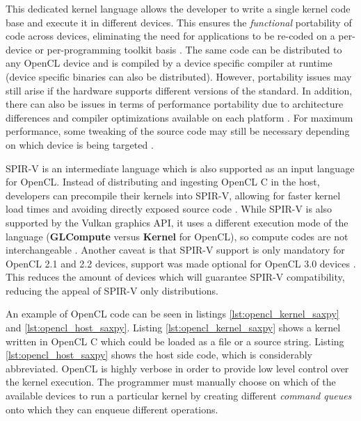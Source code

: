 This dedicated kernel language allows the developer to write a single kernel code base and execute it in different devices. This ensures the \textit{functional} portability of code across devices, eliminating the need for applications to be re-coded on a per-device or per-programming toolkit basis \cite{performance_portability_2013}. The same code can be distributed to any OpenCL device and is compiled by a device specific compiler at runtime (device specific binaries can also be distributed). However, portability issues may still arise if the hardware supports different versions of the standard. In addition, there can also be issues in terms of performance portability due to architecture differences and compiler optimizations available on each platform \cite{performance_portability_2013, performance_portability_2019, performance_portability_2020}. For maximum performance, some tweaking of the source code may still be necessary depending on which device is being targeted \cite{optimizing_opencl_fpga_integer, optimizing_opencl_fpga_automata}.

SPIR-V is an intermediate language which is also supported as an input language for OpenCL. Instead of distributing and ingesting OpenCL C in the host, developers can precompile their kernels into SPIR-V, allowing for faster kernel load times and avoiding directly exposed source code \cite{spir_overview}. While SPIR-V is also supported by the Vulkan \cite{vulkan} graphics API, it uses a different execution mode of the language (\textbf{GLCompute} versus \textbf{Kernel} for OpenCL), so compute codes are not interchangeable \cite{spir_spec}. Another caveat is that SPIR-V support is only mandatory for OpenCL 2.1 and 2.2 devices, support was made optional for OpenCL 3.0 devices \cite{opencl_spec}. This reduces the amount of devices which will guarantee SPIR-V compatibility, reducing the appeal of SPIR-V only distributions.

An example of OpenCL code can be seen in listings \ref{lst:opencl_kernel_saxpy} and \ref{lst:opencl_host_saxpy}. Listing \ref{lst:opencl_kernel_saxpy} shows a kernel written in OpenCL C which could be loaded as a file or a source string. Listing \ref{lst:opencl_host_saxpy} shows the host side code, which is considerably abbreviated. OpenCL is highly verbose in order to provide low level control over the kernel execution. The programmer must manually choose on which of the available devices to run a particular kernel by creating different \textit{command queues} onto which they can enqueue different operations. 

